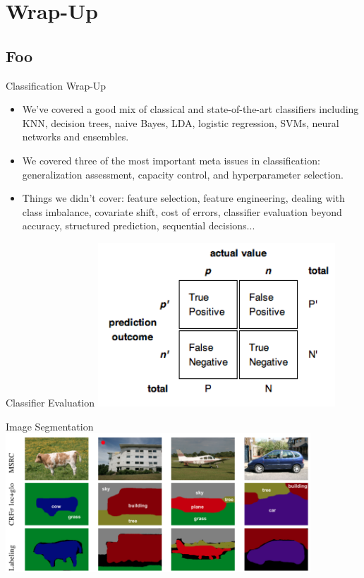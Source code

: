 \documentclass[serif,xcolor=pdftex,dvipsnames,table,hyperref={bookmarks=false,breaklinks}]{beamer}
\begin{document}
\section{Wrap-Up}
\subsection{Foo}

\begin{frame}[t]{Classification Wrap-Up}

\begin{itemize}
\setlength{\itemsep}{8pt}

\item We've covered a good mix of classical and state-of-the-art classifiers including
KNN, decision trees, naive Bayes, LDA, logistic regression, SVMs, neural networks and
ensembles.

\pause\item We covered three of the most important meta issues in classification: generalization assessment, capacity control, and hyperparameter selection. 

\pause\item Things we didn't cover: feature selection, feature engineering, 
dealing with class imbalance, covariate shift, cost of errors, classifier evaluation beyond accuracy, structured prediction, sequential decisions...
\end{itemize}
\end{frame}

\begin{frame}[t]{Classifier Evaluation}
\center%
\includegraphics[width=3.5in]{../Figures/ConfusionMatrix.png}
\end{frame}

\begin{frame}[t]{Image Segmentation}
\center
\includegraphics[width=4.5in]{../Figures/image_labeling.png}
\end{frame}
\end{document}

